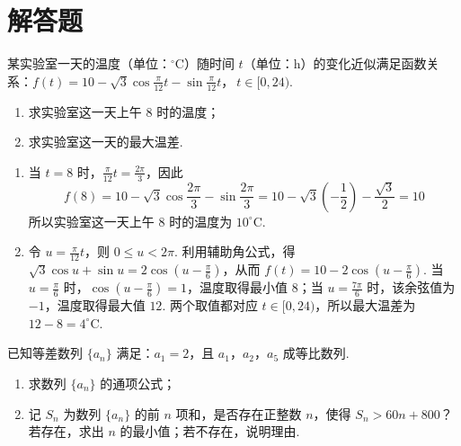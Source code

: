 \section{解答题}

\begin{problem}
某实验室一天的温度（单位：\(^{\circ}\mathrm{C}\)）随时间 \(t\)（单位：\(\mathrm{h}\)）的变化近似满足函数关系：\(f(t)=10-\sqrt{3}\cos\frac{\pi}{12}t-\sin\frac{\pi}{12}t\)，\(\ t\in[0,24)\).
\begin{enumerate}
\item 求实验室这一天上午 \(8\) 时的温度；
\item 求实验室这一天的最大温差.
\end{enumerate}
\end{problem}

\begin{solution}
\begin{enumerate}
\item 当 \(t=8\) 时，\(\frac{\pi}{12}t=\frac{2\pi}{3}\)，因此
\[
f(8)=10-\sqrt3\cos\frac{2\pi}{3}-\sin\frac{2\pi}{3}
=10-\sqrt3\left(-\frac12\right)-\frac{\sqrt3}{2}=10
\]
所以实验室这一天上午 \(8\) 时的温度为 \(10^{\circ}\mathrm{C}\).

\item 令 \(u=\frac{\pi}{12}t\)，则 \(0\leqslant u<2\pi\). 利用辅助角公式，得 \(\sqrt3\cos u+\sin u=2\cos\left(u-\frac{\pi}{6}\right)\)，从而 \(f(t)=10-2\cos\left(u-\frac{\pi}{6}\right)\).
当 \(u=\frac{\pi}{6}\) 时，\(\cos\left(u-\frac{\pi}{6}\right)=1\)，温度取得最小值 \(8\)；当 \(u=\frac{7\pi}{6}\) 时，该余弦值为 \(-1\)，温度取得最大值 \(12\). 两个取值都对应 \(t\in[0,24)\)，所以最大温差为 \(12-8=4^{\circ}\mathrm{C}\).
\end{enumerate}
\end{solution}

\begin{problem}
已知等差数列 \(\{a_{n}\}\) 满足：\(a_1 = 2\)，且 \(a_1\)，\(a_2\)，\(a_5\) 成等比数列.
\begin{enumerate}
\item 求数列 \(\{a_{n}\}\) 的通项公式；
\item 记 \(S_{n}\) 为数列 \(\{a_{n}\}\) 的前 \(n\) 项和，是否存在正整数 \(n\)，使得 \(S_{n} > 60n + 800\)？若存在，求出 \(n\) 的最小值；若不存在，说明理由.
\end{enumerate}
\end{problem}

